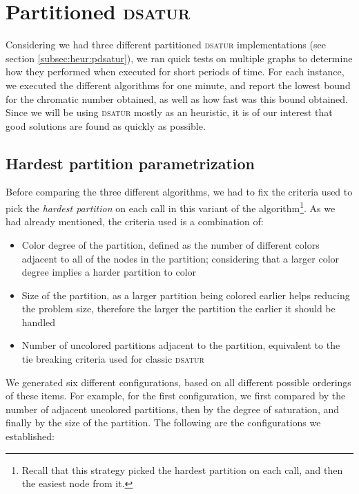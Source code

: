 
\section{Partitioned \textsc{dsatur}}
\label{subsec:resultspdsatur}

Considering we had three different partitioned \textsc{dsatur} implementations (see section \ref{subsec:heur:pdsatur}), we ran quick tests on multiple graphs to determine how they performed when executed for short periods of time. For each instance, we executed the different algorithms for one minute, and report the lowest bound for the chromatic number obtained, as well as how fast was this bound obtained. Since we will be using \textsc{dsatur} mostly as an heuristic, it is of our interest that good solutions are found as quickly as possible.

\subsection{Hardest partition parametrization}

Before comparing the three different algorithms, we had to fix the criteria used to pick the \textit{hardest partition} on each call in this variant of the algorithm\footnote{Recall that this strategy picked the hardest partition on each call, and then the easiest node from it.}. As we had already mentioned, the criteria used is a combination of:

\begin{itemize}
	\item{Color degree of the partition, defined as the number of different colors adjacent to all of the nodes in the partition; considering that a larger color degree implies a harder partition to color}
	\item{Size of the partition, as a larger partition being colored earlier helps reducing the problem size, therefore the larger the partition the earlier it should be handled}
	\item{Number of uncolored partitions adjacent to the partition, equivalent to the tie breaking criteria used for classic \textsc{dsatur}} 
\end{itemize}

We generated six different configurations, based on all different possible orderings of these items. For example, for the first configuration, we first compared by the number of adjacent uncolored partitions, then by the degree of saturation, and finally by the size of the partition. The following are the configurations we established:

